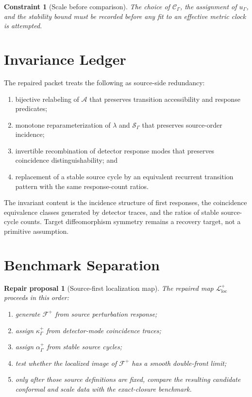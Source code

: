 \documentclass[11pt]{article}
\newcommand{\Sub}{\mathcal{A}}
\newcommand{\Order}{\mathcal{S}}
\newcommand{\Front}{\mathcal{F}}
\newcommand{\Cycle}{\mathcal{C}_{\Gamma}}
\newcommand{\Map}{\mathcal{L}_{\mathrm{loc}}}
\newtheorem{repairproposal}{Repair proposal}
\newtheorem{constraint}{Constraint}
\begin{document}
\begin{constraint}[Scale before comparison]
The choice of \(\Cycle\), the assignment of \(u_{\Gamma}\), and the stability
bound must be recorded before any fit to an effective metric clock is attempted.
\end{constraint}

\section{Invariance Ledger}

The repaired packet treats the following as source-side redundancy:
\begin{enumerate}
    \item bijective relabeling of \(\Sub\) that preserves transition
    accessibility and response predicates;
    \item monotone reparameterization of \(\lambda\) and
    \(\Order_{\Gamma}\) that preserves source-order incidence;
    \item invertible recombination of detector response modes that preserves
    coincidence distinguishability; and
    \item replacement of a stable source cycle by an equivalent recurrent
    transition pattern with the same response-count ratios.
\end{enumerate}

The invariant content is the incidence structure of first responses, the
coincidence equivalence classes generated by detector traces, and the ratios of
stable source-cycle counts. Target diffeomorphism symmetry remains a recovery
target, not a primitive assumption.

\section{Benchmark Separation}

\begin{repairproposal}[Source-first localization map]
The repaired map \(\Map^{+}\) proceeds in this order:
\begin{enumerate}
    \item generate \(\Front^{+}\) from source perturbation response;
    \item assign \(\kappa^{+}_{\Gamma}\) from detector-mode coincidence traces;
    \item assign \(\alpha^{+}_{\Gamma}\) from stable source cycles;
    \item test whether the localized image of \(\Front^{+}\) has a smooth
    double-front limit;
    \item only after those source definitions are fixed, compare the resulting
    candidate conformal and scale data with the exact-closure benchmark.
\end{enumerate}
\end{repairproposal}
\end{document}
